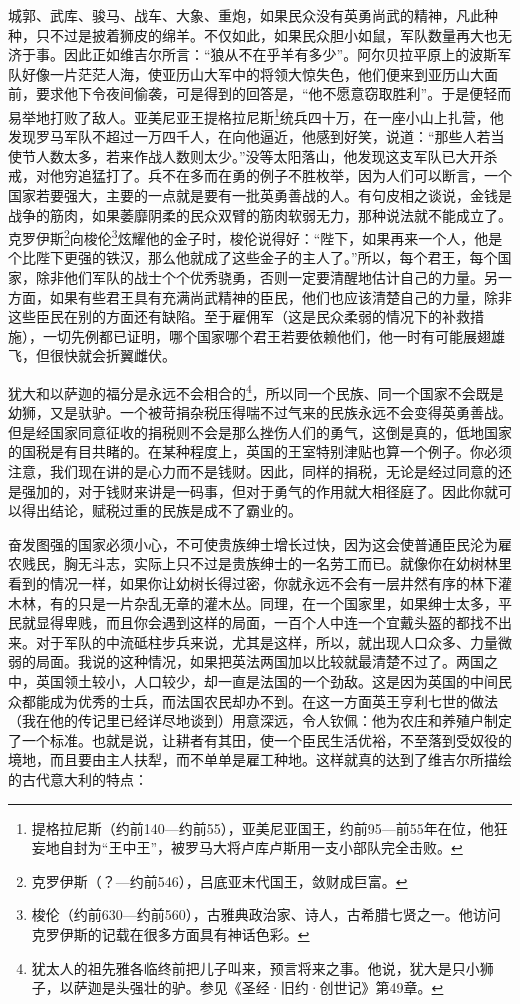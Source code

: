 \par 城郭、武库、骏马、战车、大象、重炮，如果民众没有英勇尚武的精神，凡此种种，只不过是披着狮皮的绵羊。不仅如此，如果民众胆小如鼠，军队数量再大也无济于事。因此正如维吉尔所言：“狼从不在乎羊有多少”。阿尔贝拉平原上的波斯军队好像一片茫茫人海，使亚历山大军中的将领大惊失色，他们便来到亚历山大面前，要求他下令夜间偷袭，可是得到的回答是，“他不愿意窃取胜利”。于是便轻而易举地打败了敌人。亚美尼亚王提格拉尼斯\footnote{提格拉尼斯（约前140—约前55），亚美尼亚国王，约前95—前55年在位，他狂妄地自封为“王中王”，被罗马大将卢库卢斯用一支小部队完全击败。}统兵四十万，在一座小山上扎营，他发现罗马军队不超过一万四千人，在向他逼近，他感到好笑，说道：“那些人若当使节人数太多，若来作战人数则太少。”没等太阳落山，他发现这支军队已大开杀戒，对他穷追猛打了。兵不在多而在勇的例子不胜枚举，因为人们可以断言，一个国家若要强大，主要的一点就是要有一批英勇善战的人。有句皮相之谈说，金钱是战争的筋肉，如果萎靡阴柔的民众双臂的筋肉软弱无力，那种说法就不能成立了。克罗伊斯\footnote{克罗伊斯（？—约前546），吕底亚末代国王，敛财成巨富。}向梭伦\footnote{梭伦（约前630—约前560），古雅典政治家、诗人，古希腊七贤之一。他访问克罗伊斯的记载在很多方面具有神话色彩。}炫耀他的金子时，梭伦说得好：“陛下，如果再来一个人，他是个比陛下更强的铁汉，那么他就成了这些金子的主人了。”所以，每个君王，每个国家，除非他们军队的战士个个优秀骁勇，否则一定要清醒地估计自己的力量。另一方面，如果有些君王具有充满尚武精神的臣民，他们也应该清楚自己的力量，除非这些臣民在别的方面还有缺陷。至于雇佣军（这是民众柔弱的情况下的补救措施），一切先例都已证明，哪个国家哪个君王若要依赖他们，他一时有可能展翅雄飞，但很快就会折翼雌伏。
\par 犹大和以萨迦的福分是永远不会相合的\footnote{犹太人的祖先雅各临终前把儿子叫来，预言将来之事。他说，犹大是只小狮子，以萨迦是头强壮的驴。参见《圣经·旧约·创世记》第49章。}，所以同一个民族、同一个国家不会既是幼狮，又是驮驴。一个被苛捐杂税压得喘不过气来的民族永远不会变得英勇善战。但是经国家同意征收的捐税则不会是那么挫伤人们的勇气，这倒是真的，低地国家的国税是有目共睹的。在某种程度上，英国的王室特别津贴也算一个例子。你必须注意，我们现在讲的是心力而不是钱财。因此，同样的捐税，无论是经过同意的还是强加的，对于钱财来讲是一码事，但对于勇气的作用就大相径庭了。因此你就可以得出结论，赋税过重的民族是成不了霸业的。
\par 奋发图强的国家必须小心，不可使贵族绅士增长过快，因为这会使普通臣民沦为雇农贱民，胸无斗志，实际上只不过是贵族绅士的一名劳工而已。就像你在幼树林里看到的情况一样，如果你让幼树长得过密，你就永远不会有一层井然有序的林下灌木林，有的只是一片杂乱无章的灌木丛。同理，在一个国家里，如果绅士太多，平民就显得卑贱，而且你会遇到这样的局面，一百个人中连一个宜戴头盔的都找不出来。对于军队的中流砥柱步兵来说，尤其是这样，所以，就出现人口众多、力量微弱的局面。我说的这种情况，如果把英法两国加以比较就最清楚不过了。两国之中，英国领土较小，人口较少，却一直是法国的一个劲敌。这是因为英国的中间民众都能成为优秀的士兵，而法国农民却办不到。在这一方面英王亨利七世的做法（我在他的传记里已经详尽地谈到）用意深远，令人钦佩：他为农庄和养殖户制定了一个标准。也就是说，让耕者有其田，使一个臣民生活优裕，不至落到受奴役的境地，而且要由主人扶犁，而不单单是雇工种地。这样就真的达到了维吉尔所描绘的古代意大利的特点：
